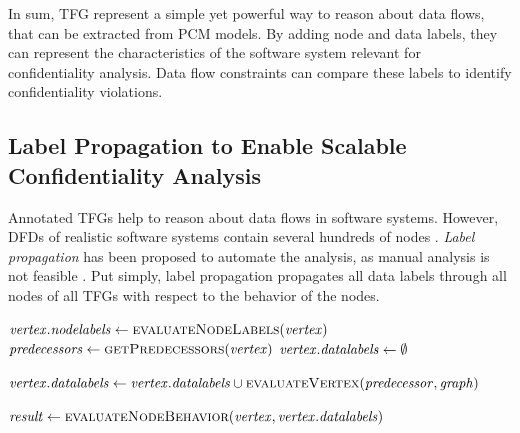 In sum, \ac{TFG} represent a simple yet powerful way to reason about data flows, that can be extracted from \ac{PCM} models.
By adding node and data labels, they can represent the characteristics of the software system relevant for confidentiality analysis.
Data flow constraints can compare these labels to identify confidentiality violations.


\subsection{Label Propagation to Enable Scalable Confidentiality Analysis}

Annotated \acp{TFG} help to reason about data flows in software systems.
However, \acp{DFD} of realistic software systems contain several hundreds of nodes \cite{hahner_architecture-based_2023}.
\emph{Label propagation} has been proposed to automate the analysis, as manual analysis is not feasible \cite{seifermann_data-driven_2019}.
Put simply, label propagation propagates all data labels through all nodes of all \acp{TFG} with respect to the behavior of the nodes.

\begin{algorithm}
    \caption{Algorithm for vertex evaluation in \acfp*{TFG}}
    \label{alg:confidentialityanalysis:vertexevaluation}
    \begin{algorithmic}[1]
            \algindentskip
            \State $\mathit{vertex.nodelabels} \gets \textsc{evaluateNodeLabels}(\mathit{vertex})$  \label{alg:confidentialityanalysis:vertexevaluation:2}
            \State $\mathit{predecessors} \gets \textsc{getPredecessors}(\mathit{vertex})$
            \State $\mathit{vertex.datalabels} \gets \emptyset$
            \algblockskip

             
                \State $\mathit{vertex.datalabels} \gets \mathit{vertex.datalabels} \cup \textsc{evaluateVertex}(\mathit{predecessor}, \mathit{graph})$\label{alg:confidentialityanalysis:vertexevaluation:6}
            \EndFor
            \algblockskip

            \State $\mathit{result} \gets \textsc{evaluateNodeBehavior}(\mathit{vertex}, \mathit{vertex.datalabels})$ \label{alg:confidentialityanalysis:vertexevaluation:8}
            \State {}
            \algindentskip
        \EndProcedure   
    \end{algorithmic}
\end{algorithm}

